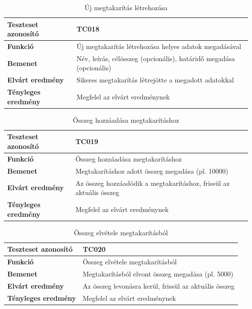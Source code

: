 \begin{table}[h!]
	\centering
	\begin{tabular}{|l|p{10cm}|}
		\hline
		\textbf{Teszteset azonosító} & TC018 \\ \hline
		\textbf{Funkció} & Új megtakarítás létrehozása helyes adatok megadásával \\ \hline
		\textbf{Bemenet} & Név, leírás, célösszeg (opcionális), határidő megadása (opcionális) \\ \hline
		\textbf{Elvárt eredmény} & Sikeres megtakarítás létrejötte a megadott adatokkal \\ \hline
		\textbf{Tényleges eredmény} & Megfelel az elvárt eredménynek \\ \hline
	\end{tabular}
	\caption{Új megtakarítás létrehozása}
	\label{tab:megtakaritas}
\end{table}

\begin{table}[h!]
	\centering
	\begin{tabular}{|l|p{10cm}|}
		\hline
		\textbf{Teszteset azonosító} & TC019 \\ \hline
		\textbf{Funkció} & Összeg hozzáadása megtakarításhoz \\ \hline
		\textbf{Bemenet} & Megtakarításhoz adott összeg megadása (pl. 10000) \\ \hline
		\textbf{Elvárt eredmény} & Az összeg hozzáadódik a megtakarításhoz, frissül az aktuális összeg \\ \hline
		\textbf{Tényleges eredmény} & Megfelel az elvárt eredménynek \\ \hline
	\end{tabular}
	\caption{Összeg hozzáadása megtakarításhoz}
	\label{tab:hozzaadas_megtakaritashoz}
\end{table}

\begin{table}[h!]
	\centering
	\begin{tabular}{|l|p{10cm}|}
		\hline
		\textbf{Teszteset azonosító} & TC020 \\ \hline
		\textbf{Funkció} & Összeg elvétele megtakarításból \\ \hline
		\textbf{Bemenet} & Megtakarításból elvont összeg megadása (pl. 5000) \\ \hline
		\textbf{Elvárt eredmény} & Az összeg levonásra kerül, frissül az aktuális összeg \\ \hline
		\textbf{Tényleges eredmény} & Megfelel az elvárt eredménynek \\ \hline
	\end{tabular}
	\caption{Összeg elvétele megtakarításból}
	\label{tab:elvetel_megtakaritasbol}
\end{table}

